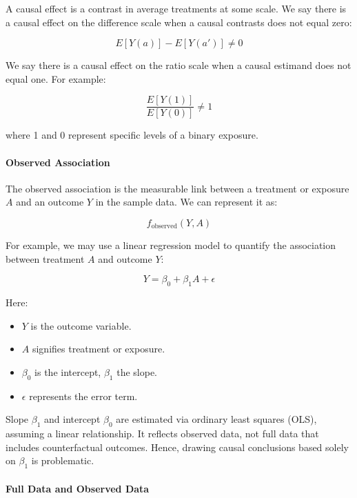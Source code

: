 \documentclass[
  singlecolumn]{article}
\let\oldparagraph\paragraph
\renewcommand{\paragraph}[1]{\oldparagraph{#1}\mbox{}}
\providecommand{\tightlist}{%
  \setlength{\itemsep}{0pt}\setlength{\parskip}{0pt}}\usepackage{longtable,booktabs,array}
\begin{document}
A causal effect is a contrast in average treatments at some scale. We
say there is a causal effect on the difference scale when a causal
contrasts does not equal zero:

\[E[Y(a)] - E[Y(a')] \neq 0\]

We say there is a causal effect on the ratio scale when a causal
estimand does not equal one. For example:

\[\frac{E[Y(1)]}{E[Y(0)]}\neq 1\]

where 1 and 0 represent specific levels of a binary exposure.

\paragraph{\texorpdfstring{\textbf{Observed
Association}}{Observed Association}}\label{observed-association}

The observed association is the measurable link between a treatment or
exposure \(A\) and an outcome \(Y\) in the sample data. We can represent
it as:

\[f_{\text{observed}}(Y, A)\]

For example, we may use a linear regression model to quantify the
association between treatment \(A\) and outcome \(Y\):

\[
Y = \beta_0 + \beta_1 A + \epsilon
\]

Here:

\begin{itemize}
\tightlist
\item
  \(Y\) is the outcome variable.
\item
  \(A\) signifies treatment or exposure.
\item
  \(\beta_0\) is the intercept, \(\beta_1\) the slope.
\item
  \(\epsilon\) represents the error term.
\end{itemize}

Slope \(\beta_1\) and intercept \(\beta_0\) are estimated via ordinary
least squares (OLS), assuming a linear relationship. It reflects
observed data, not full data that includes counterfactual outcomes.
Hence, drawing causal conclusions based solely on \(\beta_1\) is
problematic.

\paragraph{\texorpdfstring{\textbf{Full Data and Observed
Data}}{Full Data and Observed Data}}\label{full-data-and-observed-data}
\end{document}
